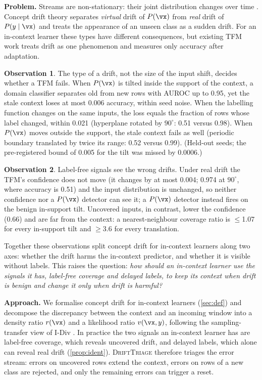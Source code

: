 \documentclass{article}
\theoremstyle{plain}
\theoremstyle{definition}
\newtheorem{observation}{Observation}
\theoremstyle{remark}
\newcommand{\method}{\textsc{DriftTriage}}   %
\begin{document}
\textbf{Problem.} Streams are non-stationary: their joint distribution changes over time
\citep{gama2014survey,lu2019learning}. Concept drift theory separates \emph{virtual} drift of $P(\vx)$ from
\emph{real} drift of $P(y\mid\vx)$ and treats the appearance of an unseen class as a sudden drift. For an in-context
learner these types have different consequences, but existing TFM work treats drift as one phenomenon and measures
only accuracy after adaptation.

\begin{observation}\label{obs:types}
The type of a drift, not the size of the input shift, decides whether a TFM fails. When $P(\vx)$ is tilted inside the
support of the context, a domain classifier separates old from new rows with AUROC up to 0.95, yet the stale context
loses at most 0.006 accuracy, within seed noise. When the labelling function changes on the same inputs, the loss
equals the fraction of rows whose label changed, within 0.021 (hyperplane rotated by $90^\circ$: 0.51 versus 0.98).
When $P(\vx)$ moves outside the support, the stale context fails as well (periodic boundary translated by twice its
range: 0.52 versus 0.99). (Held-out seeds; the pre-registered bound of 0.005 for the tilt was missed by 0.0006.)
\end{observation}

\begin{observation}\label{obs:confidence}
Label-free signals see the wrong drifts. Under real drift the TFM's confidence does not move (it changes by at most
0.004; 0.974 at $90^\circ$, where accuracy is 0.51) and the input distribution is unchanged, so neither confidence nor a $P(\vx)$
detector can see it; a $P(\vx)$ detector instead fires on the benign in-support tilt. Uncovered inputs, in contrast,
lower the confidence (0.66) and are far from the context: a nearest-neighbour coverage ratio is $\le$1.07 for every
in-support tilt and $\ge$3.6 for every translation.
\end{observation}

Together these observations split concept drift for in-context learners along two axes: whether the drift harms
the in-context predictor, and whether it is visible without labels. This raises the question: \emph{how should an
in-context learner use the signals it has, label-free coverage and delayed labels, to keep its context when drift is
benign and change it only when drift is harmful?}

\textbf{Approach.} We formalise concept drift for in-context learners (\cref{sec:def}) and decompose the
discrepancy between the context and an incoming window into a density ratio $r(\vx)$ and a likelihood ratio
$v(\vx,y)$, following the sampling-transfer view of I-Div \citep{zhao2024idiv}. In practice the two
signals an in-context learner has are label-free coverage, which reveals uncovered drift, and delayed labels, which
alone can reveal real drift (\cref{prop:ident}). \method{} therefore triages the error stream: errors on uncovered rows
extend the context, errors on rows of a new class are rejected, and only the remaining errors can trigger a reset.
\end{document}
